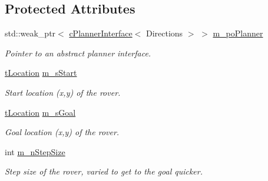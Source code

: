 \subsection*{Protected Attributes}
\begin{DoxyCompactItemize}
\item 
std\+::weak\+\_\+ptr$<$ \mbox{\hyperlink{classplanner_1_1c_planner_interface}{c\+Planner\+Interface}}$<$ Directions $>$ $>$ \mbox{\hyperlink{classplanner_1_1c_rover_interface_a22d4f0d40dd064d62ed75da9728601ea}{m\+\_\+po\+Planner}}
\begin{DoxyCompactList}\small\item\em Pointer to an abstract planner interface. \end{DoxyCompactList}\item 
\mbox{\label{classplanner_1_1c_rover_interface_a42552f6e5f1f2909821eaef8535a9979}} 
\mbox{\hyperlink{structplanner_1_1t_location}{t\+Location}} \mbox{\hyperlink{classplanner_1_1c_rover_interface_a42552f6e5f1f2909821eaef8535a9979}{m\+\_\+s\+Start}}
\begin{DoxyCompactList}\small\item\em Start location (x,y) of the rover. \end{DoxyCompactList}\item 
\mbox{\label{classplanner_1_1c_rover_interface_a705221124f88ca9dbdf706869ebfc96a}} 
\mbox{\hyperlink{structplanner_1_1t_location}{t\+Location}} \mbox{\hyperlink{classplanner_1_1c_rover_interface_a705221124f88ca9dbdf706869ebfc96a}{m\+\_\+s\+Goal}}
\begin{DoxyCompactList}\small\item\em Goal location (x,y) of the rover. \end{DoxyCompactList}\item 
\mbox{\label{classplanner_1_1c_rover_interface_aea86540c3962e223de84f28ff067d788}} 
int \mbox{\hyperlink{classplanner_1_1c_rover_interface_aea86540c3962e223de84f28ff067d788}{m\+\_\+n\+Step\+Size}}
\begin{DoxyCompactList}\small\item\em Step size of the rover, varied to get to the goal quicker. \end{DoxyCompactList}\item 
\mbox{\label{classplanner_1_1c_rover_interface_a458f3e469a13cfc909e957678ddee753}} 

\end{DoxyCompactItemize}
